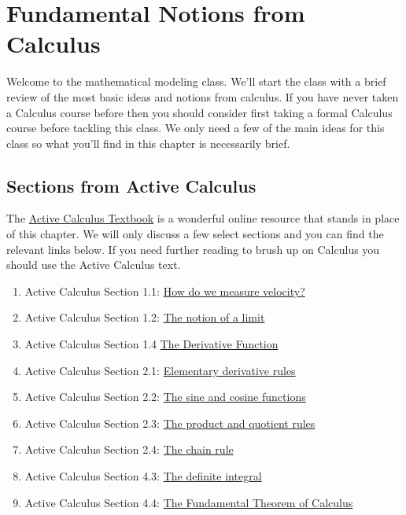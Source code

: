 \chapter{Fundamental Notions from Calculus}
Welcome to the mathematical modeling class.  We'll start the class with a brief review of
the most basic ideas and notions from calculus.  If you have never taken a Calculus course
before then you should consider first taking a formal Calculus course before tackling this
class.  We only need a few of the main ideas for this class so what you'll find in this
chapter is necessarily brief.

\section{Sections from Active Calculus}
The \href{http://faculty.gvsu.edu/boelkinm/Home/AC/index.html}{Active Calculus Textbook}
is a wonderful online resource that stands in place of this chapter.  We will only discuss a
few select sections and you can find the relevant links below.  If you need further
reading to brush up on Calculus you should use the Active Calculus text.  
\begin{enumerate}
    \item Active Calculus Section 1.1: \href{https://activecalculus.org/single/sec-1-1-vel.html}{How do we
        measure velocity?}
    \item Active Calculus Section 1.2: \href{https://activecalculus.org/single/sec-1-2-lim.html}{The notion of a
        limit}
    \item Active Calculus Section 1.4
        \href{https://activecalculus.org/single/sec-1-4-derivative-fxn.html}{The
        Derivative Function}
    \item Active Calculus Section 2.1: 
        \href{https://activecalculus.org/single/sec-2-1-elem-rules.html}{Elementary
        derivative rules}
    \item Active Calculus Section 2.2: \href{https://activecalculus.org/single/sec-2-2-sin-cos.html}{The sine and cosine functions}
    \item Active Calculus Section 2.3: \href{https://activecalculus.org/single/sec-2-3-prod-quot.html}{The
        product and quotient rules}
    \item Active Calculus Section 2.4: \href{https://activecalculus.org/single/sec-2-5-chain.html}{The chain
        rule}
    \item Active Calculus Section 4.3: 
        \href{https://activecalculus.org/single/sec-4-3-definite-integral.html}{The
        definite integral}
    \item Active Calculus Section 4.4: \href{https://activecalculus.org/single/sec-4-4-FTC.html}{The Fundamental Theorem of Calculus}
\end{enumerate}


